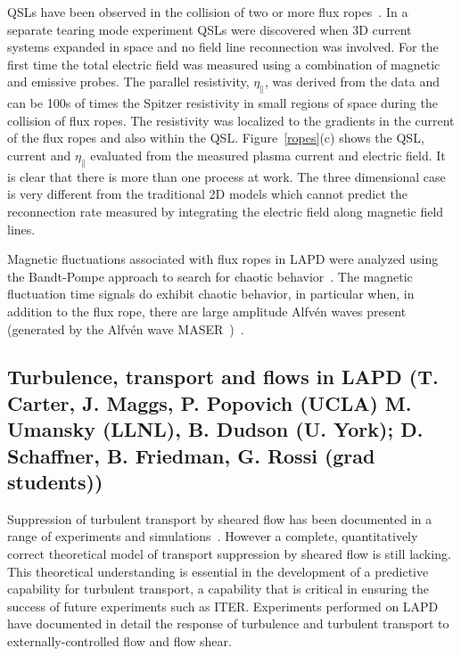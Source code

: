 \documentclass[11pt]{article}
\renewcommand{\cite}{\citep}
\begin{document}
QSLs have been observed in the collision of two or more flux
ropes~\cite{gekelman:2010,vancompernolle:2011}. In a separate tearing mode experiment QSLs
were discovered when 3D current systems expanded in space and no field
line reconnection was involved. For the first time the total electric
field was measured using a
combination of magnetic and emissive probes. The parallel resistivity,
$\eta_\parallel$, was derived from the data and can
be 100s of times the Spitzer resistivity in small regions of space
during the collision of flux ropes. The resistivity was localized to the
gradients in the current of the flux ropes and also within the QSL.
Figure~\ref{ropes}(c) shows the QSL, current and $\eta_\parallel$
evaluated from the measured plasma current and electric field.
It is clear that there is more than one process at work. The three
dimensional case is very different from the traditional 2D models which
cannot predict the reconnection rate measured by integrating the
electric field along magnetic field lines.

Magnetic fluctuations associated with flux ropes
in LAPD were analyzed using the Bandt-Pompe approach to search for chaotic
behavior~\cite{bandt:2002,rosso:2007}.  The magnetic fluctuation time
signals do exhibit chaotic behavior, in particular when, in addition
to the flux rope, there are large amplitude Alfv\'{e}n waves present
(generated by the Alfv\'{e}n wave
MASER~\cite{maggs:2003,maggs:2005})~\cite{gekelman:2014}.


\subsection{Turbulence, transport and flows in LAPD (T. Carter, J. Maggs, P.
Popovich (UCLA) M. Umansky (LLNL), B. Dudson (U. York); D. Schaffner, B.
Friedman, G. Rossi (grad students))}

Suppression of turbulent transport by sheared flow has been documented
in a range of experiments and simulations~\cite{terry:2000}.  However
a complete, quantitatively correct theoretical model of transport
suppression by sheared flow is still lacking.  This theoretical understanding is
essential in the development of a predictive capability for turbulent
transport, a capability that is critical in ensuring the success of
future experiments such as ITER. Experiments performed on LAPD have
documented in detail the response of turbulence and turbulent
transport to externally-controlled flow and flow shear.
\end{document}
